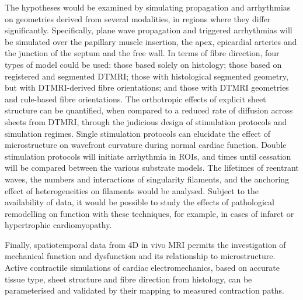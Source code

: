   The hypotheses would be examined by simulating propagation and arrhythmias on geometries derived from several modalities, in regions where they differ significantly. Specifically, plane wave propagation and triggered arrhythmias will be simulated over the papillary muscle insertion, the apex, epicardial arteries and the junction of the septum and the free wall. In terms of fibre direction, four types of model could be used: those based solely on histology; those based on registered and segmented DTMRI; those with histological segmented geometry, but with DTMRI-derived fibre orientations; and those with DTMRI geometries and rule-based fibre orientations. The orthotropic effects of explicit sheet structure can be quantified, when compared to a reduced rate of diffusion across sheets from DTMRI, through the judicious design of stimulation protocols and simulation regimes. Single stimulation protocols can elucidate the effect of microstructure on wavefront curvature during normal cardiac function. Double stimulation protocols will initiate arrhythmia in ROIs, and times until cessation will be compared between the various substrate models. The lifetimes of reentrant waves, the numbers and interactions of singularity filaments, and the anchoring effect of heterogeneities on filaments would be analysed. Subject to the availability of data, it would be possible to study the effects of pathological remodelling on function with these techniques, for example, in cases of infarct or hypertrophic cardiomyopathy.
  
  Finally, spatiotemporal data from 4D in vivo MRI permits the investigation of mechanical function and dysfunction and its relationship to microstructure. Active contractile simulations of cardiac electromechanics, based on accurate tissue type, sheet structure and fibre direction from histology, can be parameterised and validated by their mapping to measured contraction paths.

